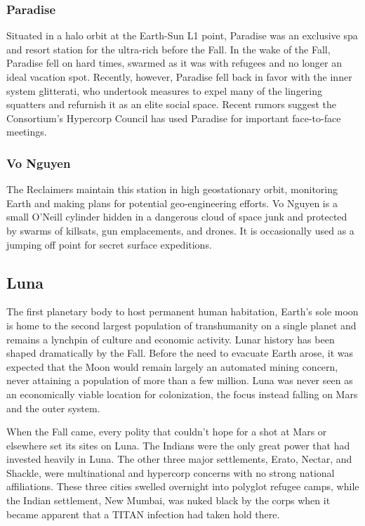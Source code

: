 \subsubsection{Paradise} \label{sec:paradise} 

Situated in a halo orbit at the Earth-Sun L1 point, Paradise was an exclusive spa and resort station for the ultra-rich before the Fall. In the wake of the Fall, Paradise fell on hard times, swarmed as it was with refugees and no longer an ideal vacation spot. Recently, however, Paradise fell back in favor with the inner system glitterati, who undertook measures to expel many of the lingering squatters and refurnish it as an elite social space. Recent rumors suggest the Consortium's Hypercorp Council has used Paradise for important face-to-face meetings. 

\subsubsection{Vo Nguyen} \label{sec:vo-nguyen} 

The Reclaimers maintain this station in high geostationary orbit, monitoring Earth and making plans for potential geo-engineering efforts. Vo Nguyen is a small O'Neill cylinder hidden in a dangerous cloud of space junk and protected by swarms of killsats, gun emplacements, and drones. It is occasionally used as a jumping off point for secret surface expeditions. 

\subsection{Luna} \label{sec:luna} 

The first planetary body to host permanent human habitation, Earth's sole moon is home to the second largest population of transhumanity on a single planet and remains a lynchpin of culture and economic activity. Lunar history has been shaped dramatically by the Fall. Before the need to evacuate Earth arose, it was expected that the Moon would remain largely an automated mining concern, never attaining a population of more than a few million. Luna was never seen as an economically viable location for colonization, the focus instead falling on Mars and the outer system. 

When the Fall came, every polity that couldn't hope for a shot at Mars or elsewhere set its sites on Luna. The Indians were the only great power that had invested heavily in Luna. The other three major settlements, Erato, Nectar, and Shackle, were multinational and hypercorp concerns with no strong national affiliations. These three cities swelled overnight into polyglot refugee camps, while the Indian settlement, New Mumbai, was nuked black by the corps when it became apparent that a TITAN infection had taken hold there. 

